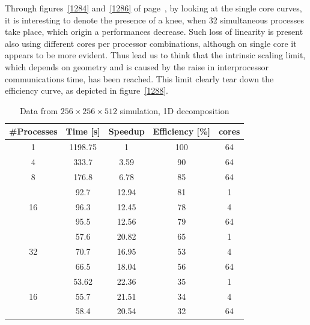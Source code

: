Through figures~\ref{1284} and~\ref{1286} of page~\pageref{1284}, by looking at the single core curves, it is interesting to denote the presence of a knee, when 32 simultaneous processes take place, which origin a performances decrease. Such loss of linearity is present also using different cores per processor combinations, although on single core it appears to be more evident. Thus lead us to think that the intrinsic scaling limit, which depends on geometry and is caused by the raise in interprocessor communications time, has been reached. This limit clearly tear down the efficiency curve, as depicted in figure~\ref{1288}.\\

\begin{table}
\caption{Data from $256\times 256\times 512$  simulation, 1D decomposition}
\begin{center}
\begin{tabular}{c c c c c}
\toprule
\textbf{\#Processes} & \textbf{Time [s]} & \textbf{Speedup} & \textbf{Efficiency [\%]} & \textbf{cores}\\
\midrule
1 & 1198.75 & 1 & 100 & 64\\
4 &  333.7 & 3.59 & 90 & 64\\
8 &  176.8 & 6.78 & 85 & 64\\
\hline
\multirow{3}{*}{16} &  92.7 & 12.94 & 81 & 1\\
& 96.3 & 12.45 & 78 & 4\\
& 95.5 & 12.56 & 79 & 64\\
\hline
\multirow{3}{*}{32} &  57.6 & 20.82 & 65 & 1\\
& 70.7 & 16.95 & 53 & 4\\
& 66.5 & 18.04 & 56 & 64\\
\hline
\multirow{3}{*}{16} &  53.62 & 22.36 & 35 & 1\\
& 55.7 & 21.51 & 34 & 4\\
& 58.4 & 20.54 & 32 & 64\\
\bottomrule
\end{tabular}
\end{center}
\label{128:data:1}
\end{table}

